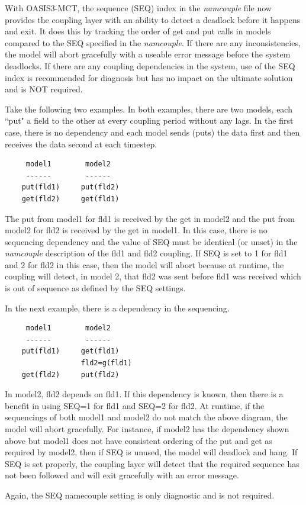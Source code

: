 With OASIS3-MCT, the sequence (SEQ) index in the {\it namcouple} file
now provides the coupling layer with an ability to detect a deadlock
before it happens and exit.  It does this by tracking the order of get
and put calls in models compared to the SEQ specified in the {\it
  namcouple}.  If there are any inconsistencies, the model will abort
gracefully with a useable error message before the system deadlocks.
If there are any coupling dependencies in the system, use of the SEQ
index is recommended for diagnosis but has no impact on the ultimate
solution and is NOT required.

Take the following two examples.  In both examples, there are two
models, each ``put" a field to the other at every coupling period
without any lags.  In the first case, there is no dependency and each
model sends (puts) the data first and then receives the data second at
each timestep.

\begin{verbatim}
     model1        model2
     ------        ------
    put(fld1)     put(fld2)
    get(fld2)     get(fld1)
\end{verbatim}

The put from model1 for fld1 is received by the get in model2 and the
put from model2 for fld2 is received by the get in model1.  In this
case, there is no sequencing dependency and the value of SEQ must be
identical (or unset) in the {\it namcouple} description of the fld1
and fld2 coupling.  If SEQ is set to 1 for fld1 and 2 for fld2 in this
case, then the model will abort because at runtime, the coupling will
detect, in model 2, that fld2 was sent before fld1 was received which
is out of sequence as defined by the SEQ settings.

In the next example, there is a dependency in the sequencing.

\begin{verbatim}
     model1        model2
     ------        ------
    put(fld1)     get(fld1)
                  fld2=g(fld1)
    get(fld2)     put(fld2)
\end{verbatim}

In model2, fld2 depends on fld1.  If this dependency is known, then
there is a benefit in using SEQ=1 for fld1 and SEQ=2 for fld2.  At
runtime, if the sequencings of both model1 and model2 do not match the
above diagram, the model will abort gracefully.  For instance, if
model2 has the dependency shown above but model1 does not have
consistent ordering of the put and get as required by model2, then if
SEQ is unused, the model will deadlock and hang.  If SEQ is set
properly, the coupling layer will detect that the required sequence
has not been followed and will exit gracefully with an error message.

Again, the SEQ namecouple setting is only diagnostic and is not
required.



